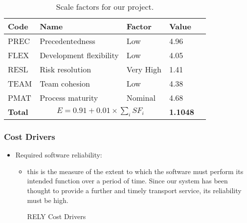 \begin{table}[H]
    \centering
    \begin{tabular}{| l | l | l | l | l |}
        \hline
        \textbf{Code}   & \textbf{Name}             & \textbf{Factor}   & \textbf{Value}    \\
        \hline
        PREC            & Precedentedness           & Low               &    4.96             \\
        \hline
        FLEX            & Development flexibility   & Low           &       4.05         \\
        \hline
        RESL            & Risk resolution           & Very High              &    1.41            \\
        \hline
        TEAM            & Team cohesion             & Low         &       4.38           \\
        \hline
        PMAT            & Process maturity          & Nominal              &   4.68              \\
        \hline
        \textbf{Total}  & \multicolumn{2}{|c|}{$E=0.91 + 0.01 \times \sum_{i}SF_i$}    &  \textbf{1.1048}     \\
        \hline
    \end{tabular}
    \caption{Scale factors for our project.}
    \label{tab:scale-factor}
\end{table}

\subsubsection{Cost Drivers}

\begin{itemize}
	\item Required software reliability: 
	\begin{itemize}
		\item [] this is the measure of the extent to which the software must perform its intended function over a period of time. Since our system has been thought to provide a further and timely transport service, its reliability must be high.
\begin{costdriverstable}{RELY Cost Drivers}
	\hline
\end{costdriverstable}
	\end{itemize}
\end{itemize}

